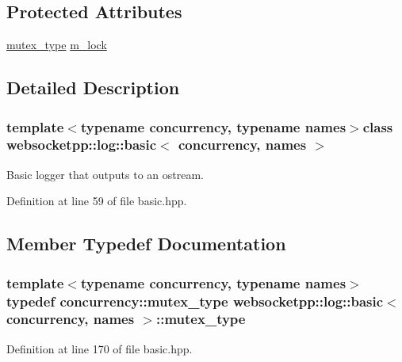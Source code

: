 \subsection*{Protected Attributes}
\begin{DoxyCompactItemize}
\item 
\hyperlink{classwebsocketpp_1_1log_1_1basic_a293124c7129b2c70c8ed33d355d3b355}{mutex\+\_\+type} \hyperlink{classwebsocketpp_1_1log_1_1basic_ad837b993a6e1070fbd3c1dc59b15a0eb}{m\+\_\+lock}
\end{DoxyCompactItemize}


\subsection{Detailed Description}
\subsubsection*{template$<$typename concurrency, typename names$>$class websocketpp\+::log\+::basic$<$ concurrency, names $>$}

Basic logger that outputs to an ostream. 

Definition at line 59 of file basic.\+hpp.



\subsection{Member Typedef Documentation}
\hypertarget{classwebsocketpp_1_1log_1_1basic_a293124c7129b2c70c8ed33d355d3b355}{}
\subsubsection[{mutex\+\_\+type}]{\setlength{\rightskip}{0pt plus 5cm}template$<$typename concurrency, typename names$>$ typedef concurrency\+::mutex\+\_\+type {\bf websocketpp\+::log\+::basic}$<$ concurrency, names $>$\+::{\bf mutex\+\_\+type}\hspace{0.3cm}{\ttfamily [protected]}}\label{classwebsocketpp_1_1log_1_1basic_a293124c7129b2c70c8ed33d355d3b355}


Definition at line 170 of file basic.\+hpp.

\hypertarget{classwebsocketpp_1_1log_1_1basic_aa11847dfc30ac1f1c9c5fc599132560f}{}
